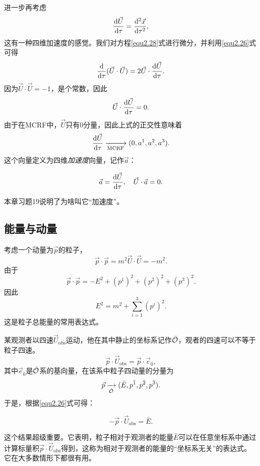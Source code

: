 进一步再考虑
\[
    \frac{\mathrm{d} \vec{U}}{\mathrm{d} \tau} = \frac{\mathrm{d}^2 \vec{x}}{\mathrm{d} \tau^2},
\]
这有一种四维加速度的感觉。我们对方程\eqref{equ2.28}式进行微分，并利用\eqref{equ2.26}式可得
\[
    \frac{\mathrm{d}}{\mathrm{d} \tau} (\vec{U} \cdot \vec{U}) = 2 \vec{U} \cdot \frac{\mathrm{d} \vec{U}}{\mathrm{d} \tau}.
\]
因为$\vec{U} \cdot \vec{U} = -1$，是个常数，因此
\[
    \vec{U} \cdot \frac{\mathrm{d} \vec{U}}{\mathrm{d} \tau} = 0.
\]
由于在MCRF中，$\vec{U}$只有0分量，因此上式的正交性意味着
\[
    \frac{\mathrm{d} \vec{U}}{\mathrm{d} \tau} \xrightarrow[\text{MCRF}]{ } (0, a^1, a^2, a^3).
\]
这个向量定义为四维\textit{加速度}向量，记作$\vec{a}$：
\begin{shaded}
\begin{equation}
    \vec{a} = \frac{\mathrm{d} \vec{U}}{\mathrm{d} \tau}, \quad \vec{U} \cdot \vec{a} = 0.
\label{equ2.32}
\end{equation}
\end{shaded}
本章习题19说明了为啥叫它“加速度”。

\subsection*{能量与动量}
考虑一个动量为$\vec{p}$的粒子，
\begin{equation}
    \vec{p} \cdot \vec{p} = m^2 \vec{U} \cdot \vec{U} = -m^2.
\label{equ2.33}
\end{equation}
由于
\[
    \vec{p} \cdot \vec{p} = -E^2 + (p^1)^2 + (p^2)^2 + (p^3)^2.
\]
因此
\begin{equation}
    E^2 = m^2 + \sum_{i = 1}^3 (p^i)^2.
\label{equ2.34}
\end{equation}
这是粒子总能量的常用表达式。

某观测者以四速$\vec{U}_{\text{obs}}$运动，他在其中静止的坐标系记作$\bar{\mathcal{O}}$，观者的四速可以不等于粒子四速。
\[
    \vec{p} \cdot \vec{U}_{\text{obs}} = \vec{p} \cdot \vec{e}_{\bar{0}},
\]
其中$\vec{e}_{\bar{0}}$是$\bar{\mathcal{O}}$系的基向量，在该系中粒子四动量的分量为
\[
    \vec{p} \xrightarrow[\bar{\mathcal{O}}]{ } (\bar{E}, p^{\bar{1}}, p^{\bar{2}}, p^{\bar{3}}).
\]
于是，根据\eqref{equ2.26}式可得：
\begin{shaded}
\begin{equation}
    -\vec{p} \cdot \vec{U}_{\text{obs}} = \bar{E}.
\label{equ2.35}
\end{equation}
\end{shaded}
这个结果超级重要。它表明，粒子相对于观测者的能量$\bar{E}$可以在任意坐标系中通过计算标量积$\vec{p} \cdot \vec{U}_{\text{obs}}$得到，这称为相对于观测者的能量的“坐标系无关”的表达式。它在大多数情形下都很有用。

